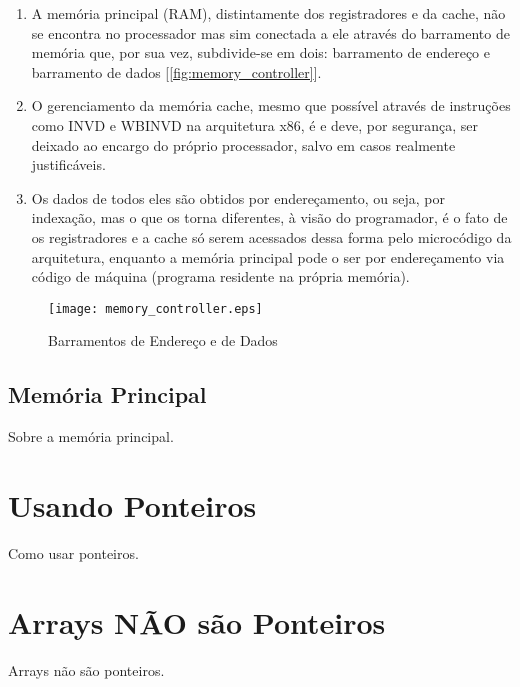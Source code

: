\begin{enumerate}
\item A memória principal (RAM), distintamente dos registradores e da cache, não se encontra no processador mas sim conectada a ele através do barramento de memória que, por sua vez, subdivide-se em dois: barramento de endereço e barramento de dados [\autoref{fig:memory_controller}].
\item O gerenciamento da memória cache, mesmo que possível através de instruções como INVD e WBINVD na arquitetura x86, é e deve, por segurança, ser deixado ao encargo do próprio processador, salvo em casos realmente justificáveis.
\item Os dados de todos eles são obtidos por endereçamento, ou seja, por indexação, mas o que os torna diferentes, à visão do programador, é o fato de os registradores e a cache só serem acessados dessa forma pelo microcódigo da arquitetura, enquanto a memória principal pode o ser por endereçamento via código de máquina (programa residente na própria memória).
\end{enumerate}

\begin{figure}[!htp]
  \centering
  \texttt{[image: memory\_controller.eps]}
  \caption{Barramentos de Endereço e de Dados}
  \label{fig:memory_controller}
\end{figure}

\subsection{Memória Principal}

Sobre a memória principal.

\section{Usando Ponteiros}

Como usar ponteiros.

\section{Arrays NÃO são Ponteiros}

Arrays não são ponteiros.

